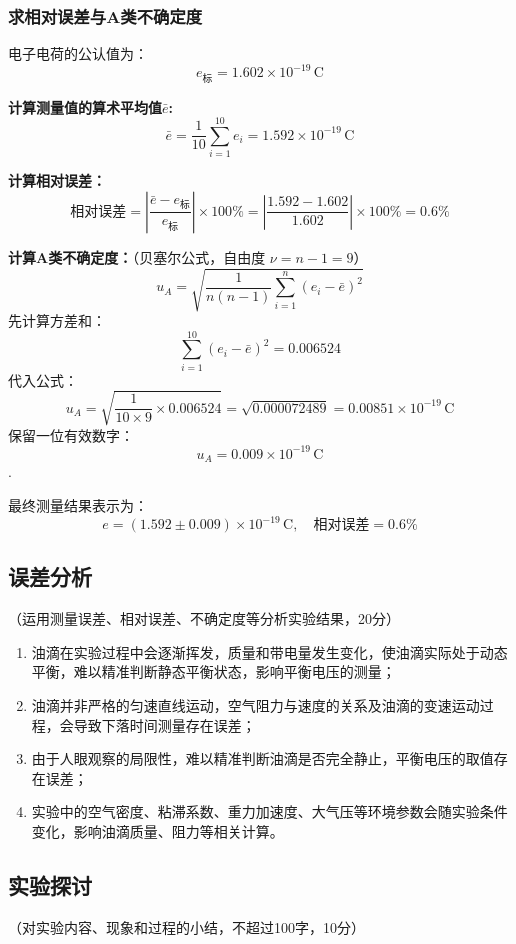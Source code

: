 \documentclass[10pt,a4paper]{ctexart}
\newcommand{\myspace}[1]{\par\vspace{#1\baselineskip}} %
\newcommand{\xiaosi}{\fontsize{12pt}{16pt}\selectfont}
\begin{document}
\subsubsection{求相对误差与A类不确定度}
电子电荷的公认值为：$$e_{\text{标}} = 1.602 \times 10^{-19} \, \text{C}$$

\vspace{2mm}
\textbf{计算测量值的算术平均值$\bar{e}$:}
$$ \bar{e} = \frac{1}{10} \sum_{i=1}^{10} e_i = 1.592 \times 10^{-19} \, \text{C} $$

\textbf{计算相对误差：}
$$ \text{相对误差} = \left| \frac{\bar{e} - e_{\text{标}}}{e_{\text{标}}} \right| \times 100\% = \left| \frac{1.592 - 1.602}{1.602} \right| \times 100\% = 0.6\% $$

\vspace{2mm}
\textbf{计算A类不确定度：}（贝塞尔公式，自由度 $\nu = n-1 = 9$）
$$ u_A = \sqrt{\frac{1}{n(n-1)} \sum_{i=1}^{n} (e_i - \bar{e})^2} $$
先计算方差和：
$$ \sum_{i=1}^{10} (e_i - \bar{e})^2 = 0.006524 $$
代入公式：
$$ u_A = \sqrt{\frac{1}{10 \times 9} \times 0.006524} = \sqrt{0.000072489} = 0.00851 \times 10^{-19} \, \text{C} $$
保留一位有效数字：$$u_A = 0.009 \times 10^{-19} \, \text{C}$$.

\vspace{2mm}
最终测量结果表示为：
$$ e = (1.592 \pm 0.009) \times 10^{-19} \, \text{C}, \quad \text{相对误差} = 0.6\% $$
    \myspace{2}
\subsection{误差分析}
    \xiaosi （运用测量误差、相对误差、不确定度等分析实验结果，20分）
\begin{enumerate}
    \item 油滴在实验过程中会逐渐挥发，质量和带电量发生变化，使油滴实际处于动态平衡，难以精准判断静态平衡状态，影响平衡电压的测量；
    \item 油滴并非严格的匀速直线运动，空气阻力与速度的关系及油滴的变速运动过程，会导致下落时间测量存在误差；
    \item 由于人眼观察的局限性，难以精准判断油滴是否完全静止，平衡电压的取值存在误差；
    \item 实验中的空气密度、粘滞系数、重力加速度、大气压等环境参数会随实验条件变化，影响油滴质量、阻力等相关计算。
\end{enumerate}
    \subsection{实验探讨}
    \xiaosi （对实验内容、现象和过程的小结，不超过100字，10分）
\end{document}
